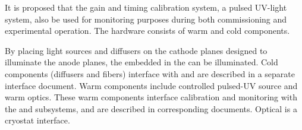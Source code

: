 





It is proposed that the \single {} gain and timing calibration system, a pulsed UV-light system, also be used for  monitoring purposes during both commissioning and experimental operation. The hardware consists of warm and cold components.  

By placing light sources and diffusers on the cathode planes designed to illuminate the anode planes, the  embedded in the  can be illuminated. Cold components (diffusers and fibers) interface with  and are described in a separate interface document.  Warm components include controlled pulsed-UV source and warm optics. These warm components interface calibration and monitoring  with the  and  subsystems, and are described in corresponding documents.  Optical \fdth is a cryostat interface. 

